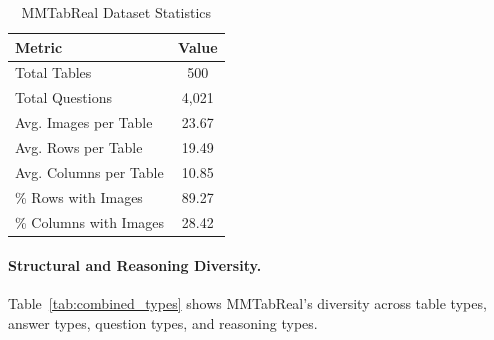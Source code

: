 \documentclass[11pt]{article}
\newcommand{\datasetName}{{\sc MMTabReal}\xspace}
\begin{document}
\begin{table}[H]
\centering
\small
\setlength{\aboverulesep}{0pt}
\setlength{\belowrulesep}{0pt}
\setlength{\tabcolsep}{5pt}
\begin{tabular}{lc}
\toprule
\textbf{Metric} & \textbf{Value} \\
\midrule
Total Tables & 500 \\
Total Questions & 4,021 \\
Avg. Images per Table & 23.67 \\
Avg. Rows per Table & 19.49 \\
Avg. Columns per Table & 10.85 \\
\% Rows with Images & 89.27 \\
\% Columns with Images & 28.42 \\
\bottomrule
\end{tabular}
\vspace{-0.5em}
\caption{\small \datasetName Dataset Statistics}
\label{tab:table_summary}
\vspace{-1.0em}
\end{table}


\paragraph{Structural and Reasoning Diversity.}
Table~\ref{tab:combined_types} shows \datasetName's diversity across table types, answer types, question types, and reasoning types.
\end{document}
